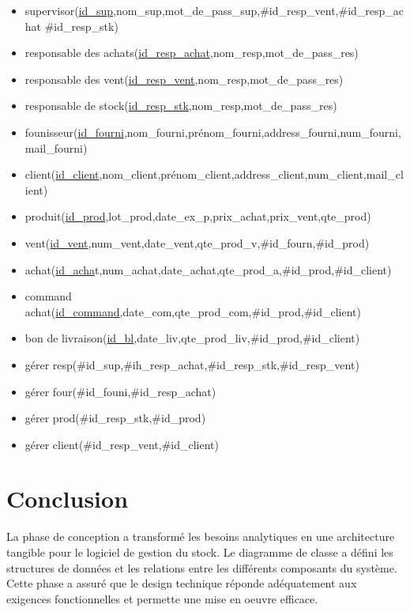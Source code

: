 \documentclass[edit,12pt,a4paper,ChapStyle,oneside,doubleinterligne]{report}
\begin{document}
\begin{itemize}
    \item supervisor(\underline{id\_sup},nom\_sup,mot\_de\_pass\_sup,\#id\_resp\_vent,\#id\_resp\_achat \#id\_resp\_stk)
    \item responsable des achats(\underline{id\_resp\_achat},nom\_resp,mot\_de\_pass\_res)
    \item responsable des vent(\underline{id\_resp\_vent},nom\_resp,mot\_de\_pass\_res)
    \item responsable de stock(\underline{id\_resp\_stk},nom\_resp,mot\_de\_pass\_res)
    \item founisseur(\underline{id\_fourni},nom\_fourni,prénom\_fourni,address\_fourni,num\_fourni,mail\_fourni)
    \item client(\underline{id\_client},nom\_client,prénom\_client,address\_client,num\_client,mail\_client)
    \item produit(\underline{id\_prod},lot\_prod,date\_ex\_p,prix\_achat,prix\_vent,qte\_prod)
    \item vent(\underline{id\_vent},num\_vent,date\_vent,qte\_prod\_v,\#id\_fourn,\#id\_prod)
    \item achat(\underline{id\_acha}t,num\_achat,date\_achat,qte\_prod\_a,\#id\_prod,\#id\_client)
    \item command achat(\underline{id\_command},date\_com,qte\_prod\_com,\#id\_prod,\#id\_client)
    \item bon de livraison(\underline{id\_bl},date\_liv,qte\_prod\_liv,\#id\_prod,\#id\_client)
    \item gérer resp(\#id\_sup,\#ih\_resp\_achat,\#id\_resp\_stk,\#id\_resp\_vent)
    \item gérer four(\#id\_founi,\#id\_resp\_achat)
    \item gérer prod(\#id\_resp\_stk,\#id\_prod)
    \item gérer client(\#id\_resp\_vent,\#id\_client)
\end{itemize}
\section{Conclusion}
La phase de conception a transformé les besoins analytiques en une architecture tangible pour le logiciel de gestion du stock. Le diagramme de classe a défini les structures de données et les relations entre les différents composants du système. Cette phase a assuré que le design technique réponde adéquatement aux exigences fonctionnelles et permette une mise en oeuvre efficace.
\end{document}
